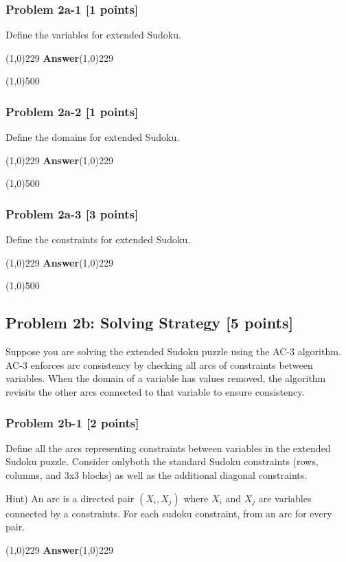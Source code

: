 \documentclass{article}%
\begin{document}
\subsubsection*{Problem 2a-1 [1 points]}
Define the variables for extended Sudoku.

\line(1,0){229}\textbf{ Answer}\line(1,0){229}


\line(1,0){500}

\subsubsection*{Problem 2a-2 [1 points]}
Define the domains for extended Sudoku.

\line(1,0){229}\textbf{ Answer}\line(1,0){229}

\line(1,0){500}

\subsubsection*{Problem 2a-3 [3 points]}
Define the constraints for extended Sudoku.

\line(1,0){229}\textbf{ Answer}\line(1,0){229}

\line(1,0){500}

\newpage
\subsection*{Problem 2b: Solving Strategy [5 points]}
Suppose you are solving the extended Sudoku puzzle using the AC-3 algorithm. AC-3 enforces arc consistency by checking all arcs of constraints between variables. When the domain of a variable has values removed, the algorithm revisits the other arcs connected to that variable to ensure consistency.

\subsubsection*{Problem 2b-1 [2 points]}
Define all the arcs representing constraints between variables in the extended Sudoku puzzle. Consider onlyboth the standard Sudoku constraints (rows, columns, and 3x3 blocks) as well as the additional diagonal constraints.

Hint) An arc is a directed pair $(X_i, X_j)$ where $X_i$ and $X_j$ are variables connected by a constraints. For each sudoku constraint, from an arc for every pair.

\line(1,0){229}\textbf{ Answer}\line(1,0){229}
\end{document}
